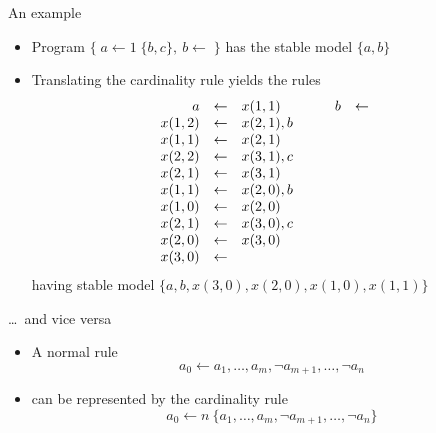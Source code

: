 \begin{frame}{An example}
\begin{itemize}
\item Program
  \(
  \{\;a\leftarrow 1\;\{b,c\},\ b\leftarrow\;\}
  \)
  has the stable model $\{a,b\}$
\item<2-> Translating the cardinality rule yields the rules
\[
\begin{array}[t]{rcl}
                 a&\leftarrow&x(1,1)
\\
x(1, 2)&\leftarrow&x(2, 1),b
\\
x(1, 1)&\leftarrow&x(2, 1)
\\
x(2, 2)&\leftarrow&x(3, 1),c
\\
x(2, 1)&\leftarrow&x(3, 1)
\\
x(1, 1)&\leftarrow&x(2, 0),b
\\
x(1, 0)&\leftarrow&x(2, 0)
\\
x(2, 1)&\leftarrow&x(3, 0),c
\\
x(2, 0)&\leftarrow&x(3, 0)
\\
x(3, 0)&\leftarrow&
\end{array}
\qquad
\begin{array}[t]{rcl}
b&\leftarrow&
\end{array}
\]
having stable model
\(
\{
a,
b,
x(3, 0),
x(2, 0),
x(1, 0),
x(1, 1)
\}
\)
\end{itemize}
\end{frame}
\begin{frame}{\dots\ and vice versa}
  \begin{itemize}
  \item A normal rule
    \[
    a_0\leftarrow a_1,\dots,a_m, \neg a_{m+1},\dots,\neg a_n
    \]
  \item[] can be represented by the cardinality rule
    \[
    a_0\leftarrow n \ \{a_1,\dots,a_m, \neg a_{m+1},\dots,\neg a_n\}
    \]
  \end{itemize}
\end{frame}
